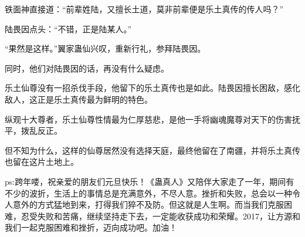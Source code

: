 \begin{this_body}
铁面神直接道：“前辈姓陆，又擅长土道，莫非前辈便是乐土真传的传人吗？”

陆畏因点头：“不错，正是陆某人。”

“果然是这样。”翼家蛊仙兴叹，重新行礼，参拜陆畏因。

同时，他们对陆畏因的话，再没有什么疑虑。

乐土仙尊没有一招杀伐手段，他留下的乐土真传也是如此。陆畏因擅长困敌，感化敌人，这正是乐土真传最为鲜明的特色。

纵观十大尊者，乐土仙尊性情最为仁厚慈悲，是他一手将幽魂魔尊对天下的伤害抚平，拨乱反正。

但不知为什么，这样的仙尊居然没有选择天庭，最终他留在了南疆，并将乐土真传也留在这片土地上。

ps:跨年喽，祝亲爱的朋友们元旦快乐！《蛊真人》又陪伴大家走了一年，期间有不少的波折，生活上的事情总是充满意外，不尽人意。挫折和失败，总会以一种令人意外的方式猛地到来，打得我们猝不及防。但这就是人生啊。而当我们克服困难，忍受失败和苦痛，继续坚持走下去，一定能收获成功和荣耀。2017，让方源和我们一起克服困难和挫折，迈向成功吧。加油！

\end{this_body}

